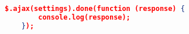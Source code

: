 \begin{itemize}
\begin{lstlisting}[language=json]
	$.ajax(settings).done(function (response) {
	    console.log(response);
	});
		\end{lstlisting}
    
\end{itemize}

